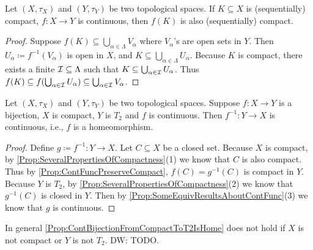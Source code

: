 \documentclass[screen,single]{techreport}
\numberwithin{equation}{section}
\newcommand{\diw}[1]{{\color{Red} DW: #1}}
\begin{document}
\begin{proposition}\label{Prop:ContFuncPreserveCompact}
	Let $(X,\tau_X)$ and $(Y,\tau_Y)$ be two topological spaces.
	If $K \subseteq X$ is (sequentially) compact, $f : X \to Y$ is continuous, then $f(K)$ is also (sequentially) compact.
\end{proposition}
\begin{proof}
	Suppose $f(K) \subseteq \bigcup_{\alpha \in \Lambda} V_\alpha$ where $V_\alpha$'s are open sets in $Y$.
	Then $U_\alpha \coloneqq f^{-1}(V_\alpha)$ is open in $X$, and $K \subseteq \bigcup_{\alpha \in \Lambda} U_\alpha$.
	Because $K$ is compact, there exists a finite $\mathcal{I} \subseteq \Lambda$ such that $K \subseteq \bigcup_{\alpha \in \mathcal{I}} U_\alpha$.
	Thus $f(K) \subseteq f(\bigcup_{\alpha \in \mathcal{I}} U_\alpha) \subseteq \bigcup_{\alpha \in \mathcal{I}} V_\alpha$.
\end{proof}

\begin{proposition}\label{Prop:ContBijectionFromCompactToT2IsHome}
	Let $(X,\tau_X)$ and $(Y,\tau_Y)$ be two topological spaces.
	Suppose $f : X \to Y$ is a bijection, $X$ is compact, $Y$ is $T_2$ and $f$ is continuous.
	Then $f^{-1} : Y \to X$ is continuous, i.e., $f$ is a homeomorphism.
\end{proposition}
\begin{proof}
	Define $g \coloneqq f^{-1} : Y \to X$.
	Let $C \subseteq X$ be a closed set.
	Because $X$ is compact, by \cref{Prop:SeveralPropertiesOfCompactness}(1) we know that $C$ is also compact.
	Thus by \cref{Prop:ContFuncPreserveCompact}, $f(C) = g^{-1}(C)$ is compact in $Y$.
	Because $Y$ is $T_2$, by \cref{Prop:SeveralPropertiesOfCompactness}(2) we know that $g^{-1}(C)$ is closed in $Y$.
	Then by \cref{Prop:SomeEquivResultsAboutContFunc}(3) we know that $g$ is continuous.
\end{proof}

\begin{example}\label{Exa:ContBijectionNotHome}
	In general \cref{Prop:ContBijectionFromCompactToT2IsHome} does not hold if $X$ is not compact or $Y$ is not $T_2$.
	\diw{TODO.}
\end{example}
\end{document}
